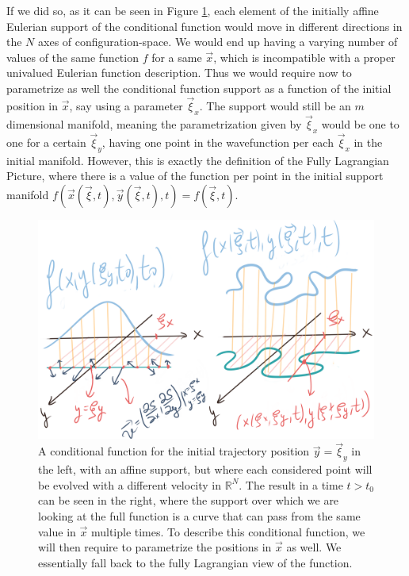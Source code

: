\documentclass[11pt, a4paper]{article} %
\newcommand{\R}{\mathbb{R}} %
\begin{document}
{If we did so, as it can be seen in Figure \ref{fig:fallback}, each element of the initially affine Eulerian support of the conditional function would move in different directions in the $N$ axes of configuration-space. We would end up having a varying number of values of the same function $f$ for a same $\vec{x}$, which is incompatible with a proper univalued Eulerian function description. Thus we would require now to parametrize as well the conditional function support as a function of the initial position in $\vec{x}$, say using a parameter $\vec{\xi}_x$. The support would still be an $m$ dimensional manifold, meaning the parametrization given by $\vec{\xi}_x$ would be one to one for a certain $\vec{\xi}_y$, having one point in the wavefunction per each $\vec{\xi}_x$ in the initial manifold. However, this is exactly the definition of the Fully Lagrangian Picture, where there is a value of the function per point in the initial support manifold $f(\vec{x}(\vec{\xi},t), \vec{y}(\vec{\xi},t),t)=f(\vec{\xi},t)$.
}


\begin{figure}[h!]
  \centering
    \includegraphics[width=0.65\linewidth]{unstructuring.png}
  \caption{A conditional function for the initial trajectory position $\vec{y}=\vec{\xi}_y$ in the left, with an affine support, but where each considered point will be evolved with a different velocity in $\R^N$. The result in a time $t>t_0$ can be seen in the right, where the support over which we are looking at the full function is a curve that can pass from the same value in $\vec{x}$ multiple times. To describe this conditional function, we will then require to parametrize the positions in $\vec{x}$ as well. We essentially fall back to the fully Lagrangian view of the function. }
  \label{fig:fallback}
\end{figure}
\end{document}
